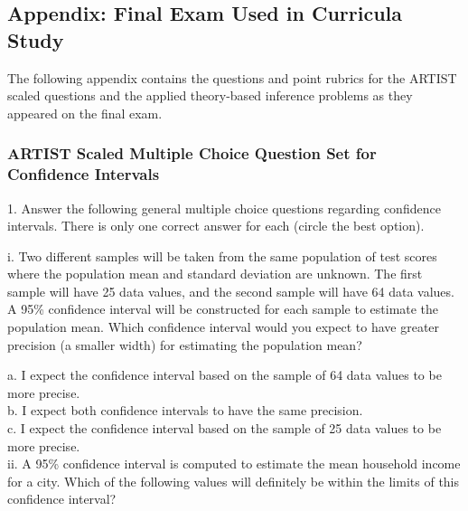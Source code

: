 \documentclass[11pt]{isuthesis}\usepackage[]{graphicx}\usepackage[]{color}
\begin{document}
\appendixtitle
\begin{appendices}
\appendix

\chapter{ }




\section{Appendix: Final Exam Used in Curricula Study}
\label{appendA}

The following appendix contains the questions and point rubrics for the ARTIST scaled questions and the applied theory-based inference problems as they appeared on the final exam.

\subsection{ARTIST Scaled Multiple Choice Question Set for Confidence Intervals}
\label{appendA1}

1. Answer the following general multiple choice questions regarding confidence intervals.  There is only one correct answer for each (circle the best option).

i. Two different samples will be taken from the same population of test scores where the population mean and standard deviation are unknown. The first sample will have 25 data values, and the second sample will have 64 data values. A 95\% confidence interval will be constructed for each sample to estimate the population mean. Which confidence interval would you expect to have greater precision (a smaller width) for estimating the population mean?

a. I expect the confidence interval based on the sample of 64 data values to be more precise.\\
b. I expect both confidence intervals to have the same precision.\\
c. I expect the confidence interval based on the sample of 25 data values to be more precise.\\

ii. A 95\% confidence interval is computed to estimate the mean household income for a city. Which of the following values will definitely be within the limits of this confidence interval?


\end{appendices}
\end{document}
